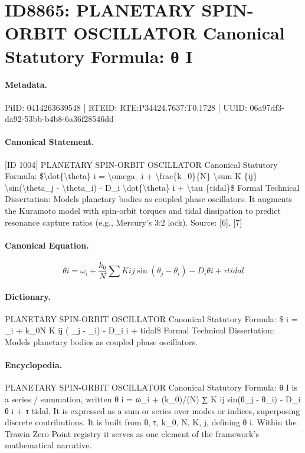 \section*{ID8865: PLANETARY SPIN-ORBIT OSCILLATOR Canonical Statutory Formula: θ I}
\paragraph{Metadata.}
PiID: 0414263639548 | RTEID: RTE:P34424.7637:T0.1728 | UUID: 06a97df3-da92-53bb-b4b8-6a36f28546dd

\paragraph{Canonical Statement.}
[ID 1004] PLANETARY SPIN-ORBIT OSCILLATOR Canonical Statutory Formula: \$\textbackslash{}dot\{\textbackslash{}theta\} i = \textbackslash{}omega\_i + \textbackslash{}frac\{k\_0\}\{N\} \textbackslash{}sum K \{ij\} \textbackslash{}sin(\textbackslash{}theta\_j - \textbackslash{}theta\_i) - D\_i \textbackslash{}dot\{\textbackslash{}theta\} i + \textbackslash{}tau \{tidal\}\$ Formal Technical Dissertation: Models planetary bodies as coupled phase oscillators. It augments the Kuramoto model with spin-orbit torques and tidal dissipation to predict resonance capture ratios (e.g., Mercury's 3:2 lock). Source: [6], [7]

\paragraph{Canonical Equation.}
\[
\dot{\theta} i = \omega_i + \frac{k_0}{N} \sum K {ij} \sin(\theta_j - \theta_i) - D_i \dot{\theta} i + \tau {tidal}
\]

\paragraph{Dictionary.}
PLANETARY SPIN-ORBIT OSCILLATOR Canonical Statutory Formula: \$ i = \_i + k\_0N K ij ( \_j - \_i) - D\_i i + tidal\$ Formal Technical Dissertation: Models planetary bodies as coupled phase oscillators.

\paragraph{Encyclopedia.}
PLANETARY SPIN-ORBIT OSCILLATOR Canonical Statutory Formula: θ I is a series / summation, written θ i = ω\_i + (k\_0)/(N) ∑ K ij sin(θ\_j - θ\_i) - D\_i θ i + τ tidal. It is expressed as a sum or series over modes or indices, superposing discrete contributions. It is built from θ, τ, k\_0, N, K, j, defining θ i. Within the Trawin Zero Point registry it serves as one element of the framework's mathematical narrative.

